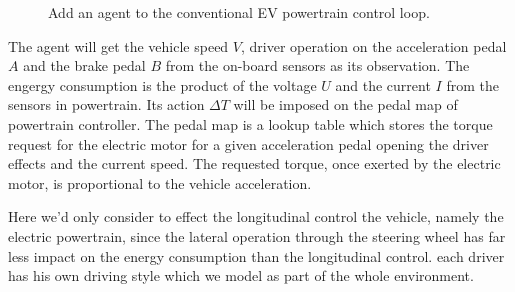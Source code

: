 \documentclass{article}
\begin{document}
\begin{figure}[!h]
	\centering
	\caption{Add an agent to the conventional EV powertrain control loop.}
	\label{fig:Agent_Powertrain}
\end{figure}


The agent will get the vehicle speed $V$, driver operation on the acceleration pedal $A$ and the brake pedal $B$ from the on-board sensors as its observation. The engergy consumption is the product of the voltage $U$ and the current $I$ from the sensors in powertrain. Its action $\Delta T$ will be imposed on the pedal map of powertrain controller. The pedal map is a lookup table which stores the torque request for the electric motor for a given acceleration pedal opening the driver effects and the current speed. The requested torque, once exerted by the electric motor, is proportional to the vehicle acceleration.


Here we'd only consider to effect the longitudinal control the vehicle, namely the electric powertrain, since the lateral operation through the steering wheel has far less impact on the energy consumption than the longitudinal control.
each driver has his own driving style which we model as part of the whole environment.
\end{document}
